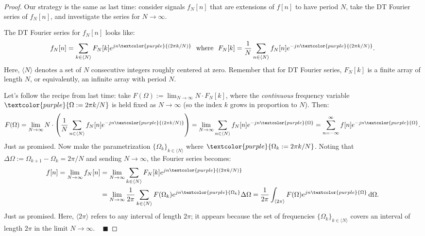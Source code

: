 \begin{proof}
    Our strategy is the same as last time:
    consider signals $f_N[n]$ that are extensions of $f[n]$ to have period $N$,
    take the DT Fourier series of $f_N[n]$, and investigate the series for $N \to \infty$.

    The DT Fourier series for $f_N[n]$ looks like:
    \[ f_N[n] = \sum_{k \in \langle N \rangle} F_N[k] e^{jn \textcolor{purple}{(2\pi k / N)}}
    ~ \text{ where } ~
    F_N[k] = \frac{1}{N} \sum_{n \in \langle N \rangle} f_N[n] e^{-jn \textcolor{purple}{(2\pi k / N)}}. \]
    Here, $\langle N \rangle$ denotes a set of $N$ consecutive integers roughly centered at zero.
    Remember that for DT Fourier series, $F_N[k]$ is a finite array of length $N$,
    or equivalently, an infinite array with period $N$.

    Let's follow the recipe from last time: take $F(\Omega) := \lim_{N \to \infty} N \cdot F_N[k]$,
    where the \emph{continuous} frequency variable $\textcolor{purple}{\Omega := 2\pi k / N}$
    is held fixed as $N \to \infty$ (so the index $k$ grows in proportion to $N$).  Then:
    \[ F(\Omega) = \lim_{N \to \infty} N \cdot \left(
        \frac{1}{N} \sum_{n \in \langle N \rangle} f_N[n] e^{-jn \textcolor{purple}{(2\pi k / N)}}
    \right)
    = \lim_{N \to \infty} \sum_{n \in \langle N \rangle} f_N[n] e^{-jn \textcolor{purple}{\Omega}}
    = \sum_{n = -\infty}^{\infty} f[n] e^{-jn \textcolor{purple}{\Omega}}. \]
    Just as promised.
    Now make the parametrization $\{\Omega_k\}_{k \in \langle N \rangle}$ where
    $\textcolor{purple}{\Omega_k := 2\pi k / N}$.
    Noting that $\Delta \Omega := \Omega_{k + 1} - \Omega_k = 2\pi / N$
    and sending $N \to \infty$, the Fourier series becomes:
    \begin{align*} f[n] = \lim_{N \to \infty} f_N[n]
    & = \lim_{N \to \infty} \sum_{k \in \langle N \rangle}
    F_N[k] e^{jn \textcolor{purple}{(2\pi k / N)}} \\
    & = \lim_{N \to \infty} \frac{1}{2\pi} \sum_{k \in \langle N \rangle}
    F(\Omega_k) e^{jn\textcolor{purple}{\Omega_k}} \Delta \Omega
    = \frac{1}{2\pi} \int_{\langle 2\pi \rangle}
    F(\Omega) e^{jn \textcolor{purple}{\Omega}} \, \mathrm{d}\Omega. \end{align*}
    Just as promised.  Here, $\langle 2\pi \rangle$ refers to
    any interval of length $2\pi$; it appears because the set of frequencies
    $\{\Omega_k\}_{k \in \langle N \rangle}$ covers an interval of length $2\pi$
    in the limit $N \to \infty$.  ~ $\blacksquare$
\end{proof}

